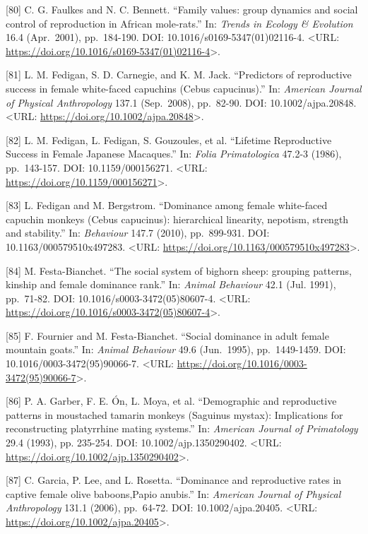 \documentclass[
]{article}
\begin{document}
{[}80{]} C. G. Faulkes and N. C. Bennett. ``Family values: group
dynamics and social control of reproduction in African mole-rats.'' In:
\emph{Trends in Ecology \& Evolution} 16.4 (Apr.~2001), pp.~184-190.
DOI: 10.1016/s0169-5347(01)02116-4. \textless URL:
\url{https://doi.org/10.1016/s0169-5347(01)02116-4}\textgreater.

{[}81{]} L. M. Fedigan, S. D. Carnegie, and K. M. Jack. ``Predictors of
reproductive success in female white-faced capuchins (Cebus
capucinus).'' In: \emph{American Journal of Physical Anthropology} 137.1
(Sep.~2008), pp.~82-90. DOI: 10.1002/ajpa.20848. \textless URL:
\url{https://doi.org/10.1002/ajpa.20848}\textgreater.

{[}82{]} L. M. Fedigan, L. Fedigan, S. Gouzoules, et al. ``Lifetime
Reproductive Success in Female Japanese Macaques.'' In: \emph{Folia
Primatologica} 47.2-3 (1986), pp.~143-157. DOI: 10.1159/000156271.
\textless URL: \url{https://doi.org/10.1159/000156271}\textgreater.

{[}83{]} L. Fedigan and M. Bergstrom. ``Dominance among female
white-faced capuchin monkeys (Cebus capucinus): hierarchical linearity,
nepotism, strength and stability.'' In: \emph{Behaviour} 147.7 (2010),
pp.~899-931. DOI: 10.1163/000579510x497283. \textless URL:
\url{https://doi.org/10.1163/000579510x497283}\textgreater.

{[}84{]} M. Festa-Bianchet. ``The social system of bighorn sheep:
grouping patterns, kinship and female dominance rank.'' In: \emph{Animal
Behaviour} 42.1 (Jul. 1991), pp.~71-82. DOI:
10.1016/s0003-3472(05)80607-4. \textless URL:
\url{https://doi.org/10.1016/s0003-3472(05)80607-4}\textgreater.

{[}85{]} F. Fournier and M. Festa-Bianchet. ``Social dominance in adult
female mountain goats.'' In: \emph{Animal Behaviour} 49.6 (Jun.~1995),
pp.~1449-1459. DOI: 10.1016/0003-3472(95)90066-7. \textless URL:
\url{https://doi.org/10.1016/0003-3472(95)90066-7}\textgreater.

{[}86{]} P. A. Garber, F. E. Ón, L. Moya, et al. ``Demographic and
reproductive patterns in moustached tamarin monkeys (Saguinus mystax):
Implications for reconstructing platyrrhine mating systems.'' In:
\emph{American Journal of Primatology} 29.4 (1993), pp. 235-254. DOI:
10.1002/ajp.1350290402. \textless URL:
\url{https://doi.org/10.1002/ajp.1350290402}\textgreater.

{[}87{]} C. Garcia, P. Lee, and L. Rosetta. ``Dominance and reproductive
rates in captive female olive baboons,Papio anubis.'' In: \emph{American
Journal of Physical Anthropology} 131.1 (2006), pp.~64-72. DOI:
10.1002/ajpa.20405. \textless URL:
\url{https://doi.org/10.1002/ajpa.20405}\textgreater.
\end{document}

